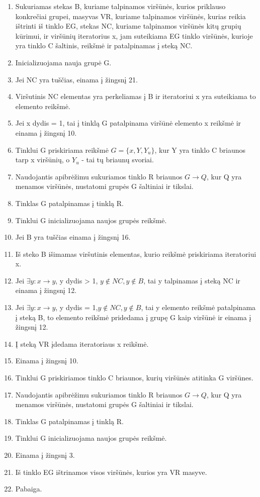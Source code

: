 \begin{enumerate}
	\item Sukuriamas stekas B, kuriame talpinamos viršūnės, kurios priklauso konkrečiai grupei, masyvas VR, kuriame talpinamos viršūnės, kurias reikia ištrinti iš tinklo EG, stekas NC, kuriame talpinamos viršūnės kitų grupių kūrimui, ir viršūnių iteratorius x, jam suteikiama EG tinklo viršūnės, kurioje yra tinklo C šaltinis, reikšmė ir patalpinamas į steką NC.
	\item Inicializuojama nauja grupė G.
	\item Jei NC yra tuščias, einama į žingsnį 21.
	\item Viršutinis NC elementas yra perkeliamas į B ir iteratoriui x yra suteikiama to elemento reikšmė.
	\item Jei x dydis = 1, tai į tinklą G patalpinama viršūnė elemento x reikšmė ir einama į žingsnį 10.
	\item Tinklui G priskiriama reikšmė $G=\{x, Y, Y_u\}$, kur Y yra tinklo C briaunos tarp x viršūnių, o $Y_u$ - tai tų briaunų svoriai. 
	\item Naudojantis apibrėžimu sukuriamos tinklo R briaunos $G \rightarrow Q$, kur Q yra menamos viršūnės, nustatomi grupės G šaltiniai ir tikslai.
	\item Tinklas G patalpinamas į tinklą R.
	\item Tinklui G inicializuojama naujos grupės reikšmė.
	\item Jei B yra tuščias einama į žingsnį 16.
	\item Iš steko B išimamas viršutinis elementas, kurio reikšmė priskiriama iteratoriui x.
	\item Jei $\exists y : x \rightarrow y$, y dydis > 1, $y \notin NC, y \notin B$, tai y talpinamas į steką NC ir einama į žingsnį 12.
	\item Jei $\exists y : x \rightarrow y$, y dydis = 1,$y \notin NC, y \notin B$, tai y elemento reikšmė patalpinama į steką B, to elemento reikšmė pridedama į grupę G kaip viršūnė ir einama į žingsnį 12.
	\item Į steką VR įdedama iteratoriaus x reikšmė.
	\item Einama į žingsnį 10.
	\item Tinklui G priskiriamos tinklo C briaunos, kurių viršūnės atitinka G viršūnes. 
	\item Naudojantis apibrėžimu sukuriamos tinklo R briaunos $G \rightarrow Q$, kur Q yra menamos viršūnės, nustatomi grupės G šaltiniai ir tikslai.
	\item Tinklas G patalpinamas į tinklą R.
	\item Tinklui G inicializuojama naujos grupės reikšmė.
	\item  Einama į žingsnį 3.
	\item  Iš tinklo EG ištrinamos visos viršūnės, kurios yra VR masyve.
	\item  Pabaiga.
\end{enumerate}

